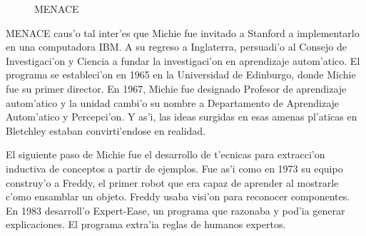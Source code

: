 \documentclass[11pt]{article}
\begin{document}
\begin{figure}[h]

\centering
{}
\caption[MENACE]{MENACE} 
\label{fig:menace}

\end{figure}


MENACE caus'o tal inter'es que Michie fue invitado a Stanford a implementarlo en una computadora IBM. A su regreso a Inglaterra, persuadi'o al Consejo de Investigaci'on y Ciencia a fundar la investigaci'on en aprendizaje autom'atico. El programa se estableci'on en 1965 en la Universidad de Edinburgo, donde Michie fue su primer director. En 1967, Michie fue designado Profesor de aprendizaje autom'atico y la unidad cambi'o su nombre a Departamento de Aprendizaje Autom'atico y Percepci'on. Y as'i, las ideas surgidas en esas amenas pl'aticas en Bletchley estaban convirti'endose en realidad.





El siguiente paso de Michie fue el desarrollo de t'ecnicas para extracci'on inductiva de conceptos a partir de ejemplos. Fue as'i como en 1973 su equipo construy'o a Freddy, el primer robot que era capaz de aprender al mostrarle c'omo ensamblar un objeto. Freddy usaba visi'on para reconocer componentes. En 1983 desarroll'o Expert-Ease, un programa que razonaba y pod'ia generar explicaciones. El programa extra'ia reglas de humanos expertos.
\end{document}
